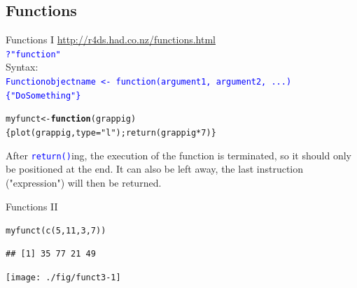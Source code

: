 \documentclass[xcolor=table,           xcolor=dvipsnames]{beamer}\usepackage[]{graphicx}\usepackage[]{color}
\makeatletter
\newcommand{\hlnum}[1]{\textcolor[rgb]{0,0,0}{#1}}
\newcommand{\hlstr}[1]{\textcolor[rgb]{0.545,0.137,0.137}{#1}}
\newcommand{\hlopt}[1]{\textcolor[rgb]{0,0,0}{#1}}
\newcommand{\hlstd}[1]{\textcolor[rgb]{0,0,0}{#1}}
\newcommand{\hlkwa}[1]{\textcolor[rgb]{1,0,0}{\textbf{#1}}}
\newcommand{\hlkwb}[1]{\textcolor[rgb]{0,0,0}{#1}}
\newcommand{\hlkwc}[1]{\textcolor[rgb]{1,0,1}{#1}}
\newcommand{\hlkwd}[1]{\textcolor[rgb]{0,0,1}{#1}}
\newenvironment{kframe}{%
 \def\at@end@of@kframe{}%
 \ifinner\ifhmode%
  \def\at@end@of@kframe{\end{minipage}}%
  \begin{minipage}{\columnwidth}%
 \fi\fi%
 \def\FrameCommand##1{\hskip\@totalleftmargin \hskip-\fboxsep
 \colorbox{shadecolor}{##1}\hskip-\fboxsep
     \hskip-\linewidth \hskip-\@totalleftmargin \hskip\columnwidth}%
 \MakeFramed {\advance\hsize-\width
   \@totalleftmargin\z@ \linewidth\hsize
   \@setminipage}}%
 {\par\unskip\endMakeFramed%
 \at@end@of@kframe}
\newenvironment{knitrout}{}{} %
\newcommand{\rcode}[1]{\texttt{\textcolor{Blue}{#1}}} %
\makeatother
\begin{document}
\subsection{Functions}

\begin{frame}[fragile]{Functions I}
\href{http://r4ds.had.co.nz/functions.html}{http://r4ds.had.co.nz/functions.html}\\
\pause
\rcode{?"function"}\\
\pause  Syntax:\\
\rcode{Functionobjectname <- \alert{function}(argument1, argument2, ...) \{"DoSomething"\}}\\
\pause
\begin{knitrout}
\color{fgcolor}\begin{kframe}
\begin{alltt}
\hlstd{myfunct} \hlkwb{<-} \hlkwa{function}\hlstd{(}\hlkwc{grappig}\hlstd{)}
       \hlstd{\{}\hlkwd{plot}\hlstd{(grappig,} \hlkwc{type}\hlstd{=}\hlstr{"l"}\hlstd{);} \hlkwd{return}\hlstd{(grappig}\hlopt{*}\hlnum{7}\hlstd{)  \}}
\end{alltt}
\end{kframe}
\end{knitrout}
\pause
After \rcode{return()}ing, the execution of the function is terminated, so it should only be positioned at the end. It can also be left away, the last instruction ("expression") will then be returned.
\end{frame}


\begin{frame}[fragile]{Functions II}
\begin{knitrout}
\color{fgcolor}\begin{kframe}
\begin{alltt}
\hlkwd{myfunct}\hlstd{(}   \hlkwd{c}\hlstd{(}\hlnum{5}\hlstd{,}\hlnum{11}\hlstd{,}\hlnum{3}\hlstd{,}\hlnum{7}\hlstd{)  )}
\end{alltt}
\begin{verbatim}
## [1] 35 77 21 49
\end{verbatim}
\end{kframe}

{\centering \texttt{[image: ./fig/funct3-1]} 

}



\end{knitrout}
\end{frame}
\end{document}

